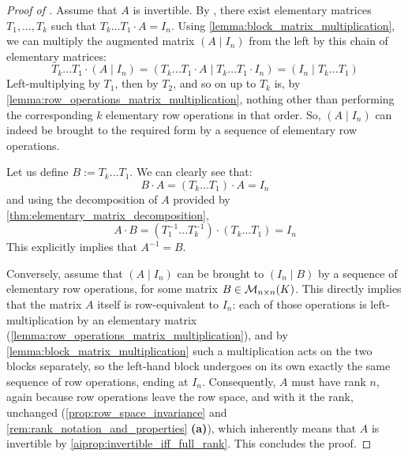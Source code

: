 \begin{proof}[Proof of ]
Assume that $A$ is invertible. By , there exist elementary matrices $T_1, \dots, T_k$ such that $T_k \dots T_1 \cdot A = I_n$. Using \cref{lemma:block_matrix_multiplication}, we can multiply the augmented matrix $(A \mid I_n)$ from the left by this chain of elementary matrices:
\begin{equation*}
    T_k \dots T_1 \cdot \left(A \mid I_n\right) = \left(T_k \dots T_1 \cdot A \mid T_k \dots T_1 \cdot I_n\right) = \left(I_n \mid T_k \dots T_1\right)
\end{equation*}
Left-multiplying by $T_1$, then by $T_2$, and so on up to $T_k$ is, by \cref{lemma:row_operations_matrix_multiplication}, nothing other than performing the corresponding $k$ elementary row operations in that order. So, $(A \mid I_n)$ can indeed be brought to the required form by a sequence of elementary row operations.

Let us define $B := T_k \dots T_1$. We can clearly see that:
\begin{equation*}
    B \cdot A = (T_k \dots T_1) \cdot A = I_n
\end{equation*}
and using the decomposition of $A$ provided by \cref{thm:elementary_matrix_decomposition},
\begin{equation*}
    A \cdot B = (T_1^{-1} \dots T_k^{-1}) \cdot (T_k \dots T_1) = I_n
\end{equation*}
This explicitly implies that $A^{-1} = B$.

Conversely, assume that $(A \mid I_n)$ can be brought to $(I_n \mid B)$ by a sequence of elementary row operations, for some matrix $B \in \mathcal{M}_{n \times n}(K)$. This directly implies that the matrix $A$ itself is row-equivalent to $I_n$: each of those operations is left-multiplication by an elementary matrix (\cref{lemma:row_operations_matrix_multiplication}), and by \cref{lemma:block_matrix_multiplication} such a multiplication acts on the two blocks separately, so the left-hand block undergoes on its own exactly the same sequence of row operations, ending at $I_n$. Consequently, $A$ must have rank $n$, again because row operations leave the row space, and with it the rank, unchanged (\cref{prop:row_space_invariance} and \cref{rem:rank_notation_and_properties} \textbf{(a)}), which inherently means that $A$ is invertible by \cref{aiprop:invertible_iff_full_rank}. This concludes the proof.
\end{proof}


